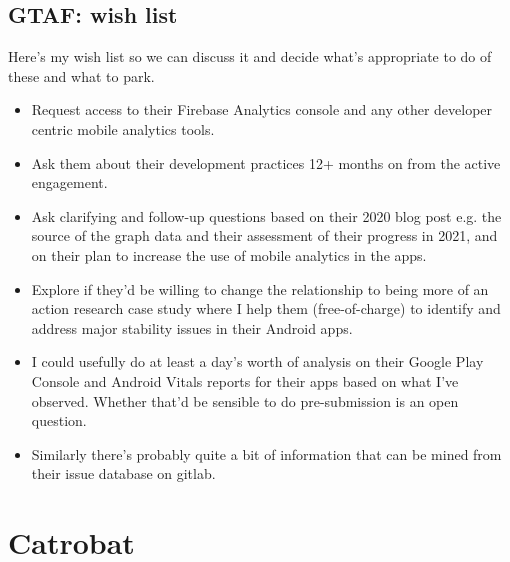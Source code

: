 \subsection*{GTAF: wish list}
Here's my wish list so we can discuss it and decide what's appropriate to do of these and what to park.
{\small
\begin{itemize}
    \itemsep0em
    \item Request access to their Firebase Analytics console and any other developer centric mobile analytics tools.
    \item Ask them about their development practices 12+ months on from the active engagement.
    \item Ask clarifying and follow-up questions based on their 2020 blog post e.g. the source of the graph data and their assessment of their progress in 2021, and on their plan to increase the use of mobile analytics in the apps.
    \item Explore if they'd be willing to change the relationship to being more of an action research case study where I help them (free-of-charge) to identify and address major stability issues in their Android apps.
\end{itemize}

\begin{itemize}
    \itemsep0em
    \item I could usefully do at least a day's worth of analysis on their Google Play Console and Android Vitals reports for their apps based on what I've observed. Whether that'd be sensible to do pre-submission is an open question.
    \item Similarly there's probably quite a bit of information that can be mined from their issue database on gitlab.
\end{itemize}
}  %

\clearpage





\section{Catrobat}~\label{case-study-overview-catrobat}

